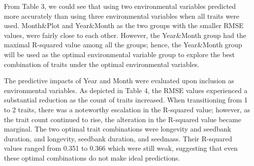 \documentclass[a4paper, 11, margin=2cm]{article}
\begin{document}
    From Table 3, we could see that using two environmental variables predicted more accurately than using three environmental variables when all traits were used. Month\&Plot and Year\&Month as the two groups with the smaller RMSE values, were fairly close to each other. However, the Year\&Month group had the maximal R-squared value among all the groups; hence, the Year\&Month group will be used as the optimal environmental variable group to explore the best combination of traits under the optimal environmental variables.


       \begin{table}[H]
        \begin{center}
          \caption{Metrics(Means and 95\% confidence intervals for R-squared and RMSE) for assessing the predictions of the Traitglm model when using all traits with Month\&Plot, Year\&Plot, Year\&Month, and All environmental variables(Year, Month, and Plot) as inputs to the environmental variables, respectively.}
        \end{center}
      \end{table}
      
      The predictive impacts of Year and Month were evaluated upon inclusion as environmental variables. As depicted in Table 4, the RMSE values experienced a substantial reduction as the count of traits increased. When transitioning from 1 to 2 traits, there was a noteworthy escalation in the R-squared value; however, as the trait count continued to rise, the alteration in the R-squared value became marginal. The two optimal trait combinations were longevity and seedbank duration, and longevity, seedbank duration, and seedmass. Their R-squared values ranged from 0.351 to 0.366 which were still weak, suggesting that even these optimal combinations do not make ideal predictions.
\end{document}
